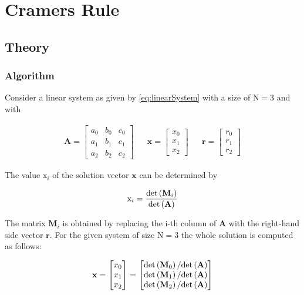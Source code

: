 \newpage
\section{Cramers Rule}
\label{sec:cramersRule}
\subsection{Theory}
\subsubsection{Algorithm}
Consider a linear system as given by \cref{eq:linearSystem} with a size of $\mathrm{N}=3$ and with


\begin{align*}
\mathbf{A}
=
\begin{bmatrix}
a_0&b_0&c_0\\
a_1&b_1&c_1\\
a_2&b_2&c_2
\end{bmatrix}
&&
\mathbf{x}
=
\begin{bmatrix}
x_0\\
x_1\\
x_2
\end{bmatrix}
&&
\mathbf{r}
=
\begin{bmatrix}
r_0\\
r_1\\
r_2
\end{bmatrix}
\end{align*}

The value $\mathrm{x}_i$ of the solution vector $\mathbf{x}$ can be determined by

\begin{align*}
\mathrm{x}_i = \frac{\mathrm{det}\left(\mathbf{M}_i\right)}{\mathrm{det}\left(\mathbf{A}\right)}
\end{align*}

The matrix $\mathbf{M}_i$ is obtained by replacing the i-th  column of $\mathbf{A}$ with the right-hand side vector $\mathbf{r}$.
For the given system of size  $\mathrm{N}=3$ the whole solution is computed as follows:

\begin{align*}
\mathbf{x}
=
\begin{bmatrix}
x_0\\
x_1\\
x_2
\end{bmatrix}
=
\begin{bmatrix}
\mathrm{det}\left(\mathbf{M}_0\right) / \mathrm{det}\left(\mathbf{A}\right)\\
\mathrm{det}\left(\mathbf{M}_1\right) / \mathrm{det}\left(\mathbf{A}\right)\\
\mathrm{det}\left(\mathbf{M}_2\right) / \mathrm{det}\left(\mathbf{A}\right)\\
\end{bmatrix}
\end{align*}

